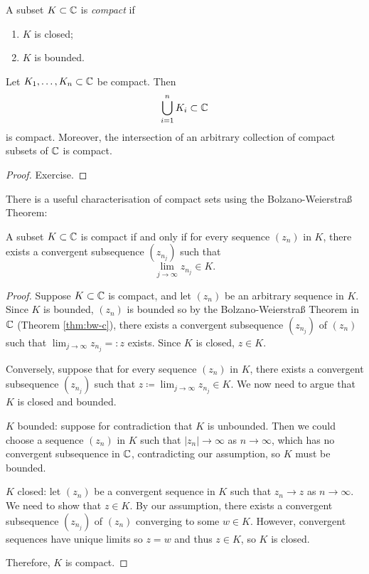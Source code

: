 \documentclass[../analysis1.tex]{subfiles}
\begin{document}
\begin{definition}
    \begin{shaded*}
        A subset $K\subset \mathbb{C}$ is \textit{compact} if
        \begin{enumerate}
            \item[1.] $K$ is closed;
            \item[2.] $K$ is bounded. 
        \end{enumerate}
    \end{shaded*}
\end{definition}

\begin{lemma}
    \begin{shaded*}
    Let $K_1,\dots,K_n\subset \mathbb{C}$ be compact. Then
    \[\bigcup_{i=1}^n K_i\subset\mathbb{C}\]
    is compact. Moreover, the intersection of an arbitrary collection of compact subsets of $\mathbb{C}$ is compact.
    \end{shaded*}
\end{lemma}
\begin{proof}
    Exercise.\qedhere
\end{proof}
There is a useful characterisation of compact sets using the Bolzano-Weierstraß Theorem:
\begin{theorem}
\label{thm:bwcompact}
    \begin{shaded*}
    A subset $K\subset \mathbb{C}$ is compact if and only if for every sequence $(z_n)$ in $K$, there exists a convergent subsequence $(z_{n_j})$ such that
    \[\lim_{j\to\infty}z_{n_j}\in K.\] 
    \end{shaded*} 
\end{theorem}
\begin{proof}
    Suppose $K\subset\mathbb{C}$ is compact, and let $(z_n)$ be an arbitrary sequence in $K$. Since $K$ is bounded, $(z_n)$ is bounded so by the Bolzano-Weierstraß Theorem in $\mathbb{C}$ (Theorem \ref{thm:bw-c}), there exists a convergent subsequence $(z_{n_j})$ of $(z_n)$ such that $\lim_{j\to\infty}z_{n_j}=:z$ exists. Since $K$ is closed, $z\in K$.\par
    Conversely, suppose that for every sequence $(z_n)$ in $K$, there exists a convergent subsequence $(z_{n_j})$ such that $z\coloneqq\lim_{j\to\infty}z_{n_j}\in K$. We now need to argue that $K$ is closed and bounded.\par
    $K$ bounded: suppose for contradiction that $K$ is unbounded. Then we could choose a sequence $(z_n)$ in $K$ such that $|z_n|\to\infty$ as $n\to\infty$, which has no convergent subsequence in $\mathbb{C}$, contradicting our assumption, so $K$ must be bounded.\par
    $K$ closed: let $(z_n)$ be a convergent sequence in $K$ such that $z_n\to z$ as $n\to\infty$. We need to show that $z\in K$. By our assumption, there exists a convergent subsequence $(z_{n_j})$ of $(z_n)$ converging to some $w\in K$. However, convergent sequences have unique limits so $z=w$ and thus $z\in K$, so $K$ is closed.\par
    Therefore, $K$ is compact.\qedhere
\end{proof}
\end{document}
